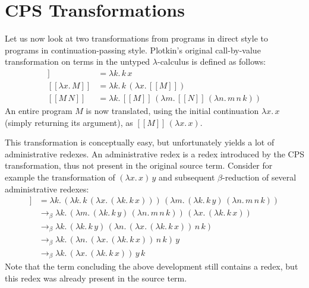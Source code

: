 \documentclass[a4paper,11pt,draft]{article}
\begin{document}
\section{CPS Transformations}\label{sec:transformations}

Let us now look at two transformations from programs in direct style to programs in
continuation-passing style. Plotkin's original call-by-value transformation on terms
in the untyped $\lambda$-calculus is defined as follows:
\begin{align*}
  [\![x]\!]               &= \lambda k. \, k \, x\\
  [\![\lambda x. \, M]\!] &= \lambda k. \, k \, (\lambda x. \, [\![M]\!])\\
  [\![M \, N]\!]          &= \lambda k. \, [\![M]\!] \, (\lambda m. \, [\![N]\!] \, (\lambda n. \, m \, n \, k))
\end{align*}
An entire program $M$ is now translated, using the initial continuation
$\lambda x. \, x$ (simply returning its argument), as
$[\![M]\!] \, (\lambda x. \, x)$.

This transformation is conceptually easy, but unfortunately yields a lot of
administrative redexes. An administrative redex is a redex introduced by the CPS
transformation, thus not present in the original source term. Consider for example
the transformation of $(\lambda x. \, x) \, y$ and subsequent $\beta$-reduction
of several administrative redexes:
\begin{align*}
  [\![(\lambda x. \, x) \, y]\!] &= \lambda k. \, (\lambda k. \, k \, (\lambda x. \, (\lambda k. \, k \, x))) \, (\lambda m. \, (\lambda k. \, k \, y) \,
 (\lambda n. \, m \, n \, k))\\
                                 &\rightarrow_{\beta} \lambda k. \, (\lambda m. \, (\lambda k. \, k \, y) \, (\lambda n. \, m \, n \, k)) \, (\lambda x.
\, (\lambda k. \, k \, x))\\
                                 &\rightarrow_{\beta} \lambda k. \, (\lambda k. \, k \, y) \, (\lambda n. \, (\lambda x. \, (\lambda k. \, k \, x)) \, n
\, k)\\
                                 &\rightarrow_{\beta} \lambda k. \, (\lambda n. \, (\lambda x. \, (\lambda k. \, k \, x)) \, n \, k) \, y\\
                                 &\rightarrow_{\beta} \lambda k. \, (\lambda x. \, (\lambda k. \, k \, x)) \, y \, k
\end{align*}
Note that the term concluding the above development still contains a redex, but
this redex was already present in the source term.
\end{document}
